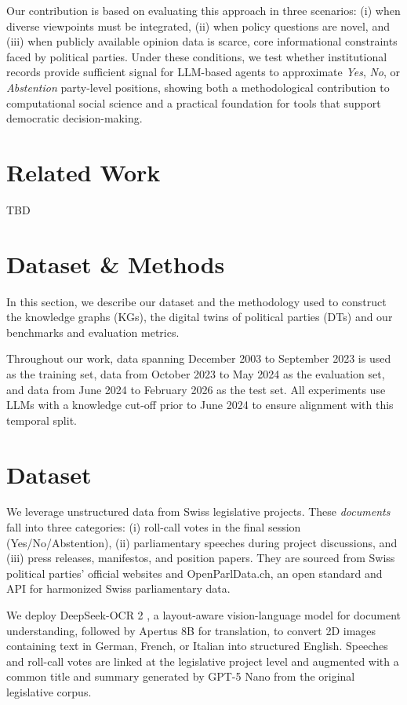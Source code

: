 \documentclass[letterpaper]{article}
\begin{document}
Our contribution is based on evaluating this approach in three scenarios: (i) when diverse viewpoints must be integrated, (ii) when policy questions are novel, and (iii) when publicly available opinion data is scarce, core informational constraints faced by political parties. Under these conditions, we test whether institutional records provide sufficient signal for LLM-based agents to approximate \emph{Yes}, \emph{No}, or \emph{Abstention} party-level positions, showing both a methodological contribution to computational social science and a practical foundation for tools that support democratic decision-making.

\section{Related Work}

TBD

\section{Dataset \& Methods}

In this section, we describe our dataset and the methodology used to construct the knowledge graphs (KGs), the digital twins of political parties (DTs) and our benchmarks and evaluation metrics.

Throughout our work, data spanning December 2003 to September 2023 is used as the training set, data from October 2023 to May 2024 as the evaluation set, and data from June 2024 to February 2026 as the test set. All experiments use LLMs with a knowledge cut-off prior to June 2024 to ensure alignment with this temporal split.

\section{Dataset}

We leverage unstructured data from Swiss legislative projects. These \emph{documents} fall into three categories: (i) roll-call votes in the final session (Yes/No/Abstention), (ii) parliamentary speeches during project discussions, and (iii) press releases, manifestos, and position papers. They are sourced from Swiss political parties’ official websites and OpenParlData.ch, an open standard and API for harmonized Swiss parliamentary data.

We deploy DeepSeek-OCR 2 \citep{wei2026deepseek}, a layout-aware vision-language model for document understanding, followed by Apertus 8B \citep{apertus2025apertus} for translation, to convert 2D images containing text in German, French, or Italian into structured English. Speeches and roll-call votes are linked at the legislative project level and augmented with a common title and summary generated by GPT-5 Nano from the original legislative corpus.
\end{document}
